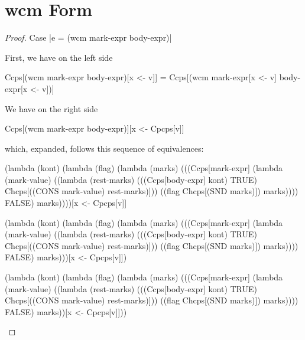\section{wcm Form}
\begin{proof}{Case \scheme|e = (wcm mark-expr body-expr)|}

First, we have on the left side
\begin{schemeblock}
\begin{schemedisplay}
Ccps[(wcm mark-expr body-expr)[x <- v]] = Ccps[(wcm mark-expr[x <- v] body-expr[x <- v])]
\end{schemedisplay}
\end{schemeblock}

We have on the right side
\begin{schemeblock}
\begin{schemedisplay}
Ccps[(wcm mark-expr body-expr)][x <- Cpcps[v]]
\end{schemedisplay}
\end{schemeblock}
which, expanded, follows this sequence of equivalences:

\begin{schemeblock}
\begin{schemedisplay}
(lambda (kont)
  (lambda (flag)
    (lambda (marks)
      (((Ccps[mark-expr]
          (lambda (mark-value) 
            ((lambda (rest-marks) 
               (((Ccps[body-expr] kont) TRUE) Chcps[((CONS mark-value) rest-marks)]))
             ((flag Chcps[(SND marks)]) marks))))
        FALSE) marks))))[x <- Cpcps[v]]
\end{schemedisplay}
\end{schemeblock}

\begin{schemeblock}
\begin{schemedisplay}
(lambda (kont)
  (lambda (flag)
    (lambda (marks)
      (((Ccps[mark-expr]
          (lambda (mark-value) 
            ((lambda (rest-marks) 
               (((Ccps[body-expr] kont) TRUE) Chcps[((CONS mark-value) rest-marks)]))
             ((flag Chcps[(SND marks)]) marks))))
        FALSE) marks)))[x <- Cpcps[v]])
\end{schemedisplay}
\end{schemeblock}

\begin{schemeblock}
\begin{schemedisplay}
(lambda (kont)
  (lambda (flag)
    (lambda (marks)
      (((Ccps[mark-expr]
          (lambda (mark-value) 
            ((lambda (rest-marks) 
               (((Ccps[body-expr] kont) TRUE) Chcps[((CONS mark-value) rest-marks)]))
             ((flag Chcps[(SND marks)]) marks))))
        FALSE) marks))[x <- Cpcps[v]]))
\end{schemedisplay}
\end{schemeblock}


\end{proof}

